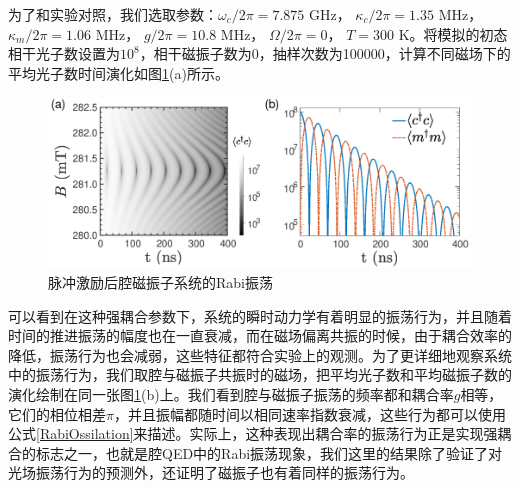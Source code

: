 为了和实验对照，我们选取参数：$\omega_c/2\pi=7.875$ GHz， $\kappa_c/2\pi=1.35$ MHz， $\kappa_m/2\pi=1.06$ MHz， $g/2\pi=10.8$ MHz， $\Omega/2\pi=0$， $T=300$ K。将模拟的初态相干光子数设置为$10^8$，相干磁振子数为0，抽样次数为100000，计算不同磁场下的平均光子数时间演化如图\ref{Evolution1stOrder}(a)所示。
\begin{figure}[htbp]
	\centering
	\includegraphics[width=2\basefigurewidth,clip]{./figure/5_2}
	\caption{脉冲激励后腔磁振子系统的Rabi振荡} 
	\label{Evolution1stOrder}
\end{figure}
可以看到在这种强耦合参数下，系统的瞬时动力学有着明显的振荡行为，并且随着时间的推进振荡的幅度也在一直衰减，而在磁场偏离共振的时候，由于耦合效率的降低，振荡行为也会减弱，这些特征都符合实验上的观测。为了更详细地观察系统中的振荡行为，我们取腔与磁振子共振时的磁场，把平均光子数和平均磁振子数的演化绘制在同一张图\ref{Evolution1stOrder}(b)上。我们看到腔与磁振子振荡的频率都和耦合率$g$相等，它们的相位相差$\pi$，并且振幅都随时间以相同速率指数衰减，这些行为都可以使用公式\eqref{RabiOssilation}来描述。实际上，这种表现出耦合率的振荡行为正是实现强耦合的标志之一，也就是腔QED中的Rabi振荡现象，我们这里的结果除了验证了对光场振荡行为的预测外，还证明了磁振子也有着同样的振荡行为。

